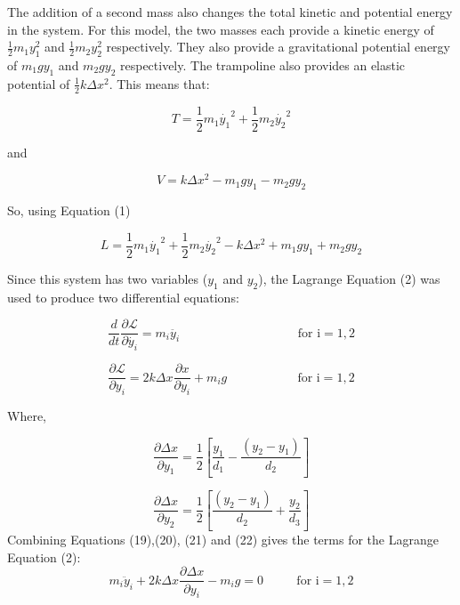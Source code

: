 \noindent The addition of a second mass also changes the total kinetic and potential energy in the system. For this model, the two masses each provide a kinetic energy of $\frac{1}{2}m_1y_{1}^{2}$ and $\frac{1}{2}m_2y_{2}^{2}$ respectively. They also provide a gravitational potential energy of $m_1gy_1$ and $m_2gy_2$ respectively. The trampoline also provides an elastic potential of $\frac{1}{2}k\Delta x^2$. This means that:

\begin{equation}
T = \frac{1}{2}m_{1}\dot{y_{1}}^{2} + \frac{1}{2}m_{2}\dot{y_2}^{2}
\end{equation}

\noindent and

\begin{equation}
V = k\Delta x^{2} - m_{1}gy_{1} - m_{2}gy_{2} 
\end{equation}

\noindent So, using Equation (1)

\begin{equation}
L = \frac{1}{2}m_{1}\dot{y_{1}}^{2} + \frac{1}{2}m_{2}\dot{y_2}^{2} - k\Delta x^{2} + m_{1}gy_{1} + m_{2}gy_{2} 
\end{equation}

\noindent Since this system has two variables ($y_1$ and $y_2$), the Lagrange Equation (2) was used to produce two differential equations:

\begin{equation}
\frac{d}{dt}\frac{\partial \mathcal{L}}{\partial \dot{y_i}} = m_{i}\ddot{y_{i}}\,\,\,\,\,\,\,\,\,\,\,\,\,\,\,\,\,\,\,\,\,\,\,\,\,\,\,\,\,\,\,\,\,\,\,\,\,\,\,\,\,\,\,\,\,\,\,\,\,\,\,\,\,\,\,\,\, \text{for i} = 1,2
\end{equation}

\begin{equation}
\frac{\partial \mathcal{L}}{\partial y_{i}} = 2k \Delta x \frac{\partial x}{\partial y_{i}}+m_{i}g \,\,\,\,\,\,\,\,\,\,\,\,\,\,\,\,\,\,\,\,\,\,\,\,\,\,\,\,\,\,\,\,\,\, \text{for i} = 1,2
\end{equation}

\noindent Where,

\begin{equation}
\frac{\partial\Delta x}{\partial y_1} = \frac{1}{2}\left[\frac{y_{1}}{d_1} - \frac{(y_{2}-y_{1})}{d_2}\right]
\end{equation}

\begin{equation}
\frac{\partial\Delta x}{\partial y_2} = \frac{1}{2}\left[\frac{(y_{2}-y_{1})}{d_2} +\frac{y_2}{d_3} \right]
\end{equation}
\noindent Combining Equations (19),(20), (21) and (22) gives the terms for the Lagrange Equation (2):
\begin{equation}
m_{i}\ddot y_{i} + 2k\Delta x \frac{\partial \Delta x}{\partial y_{i}} - m_{i}g = 0 \,\,\,\,\,\,\,\,\,\,\,\,\,\,\,\, \text{for i} = 1,2
\end{equation}

